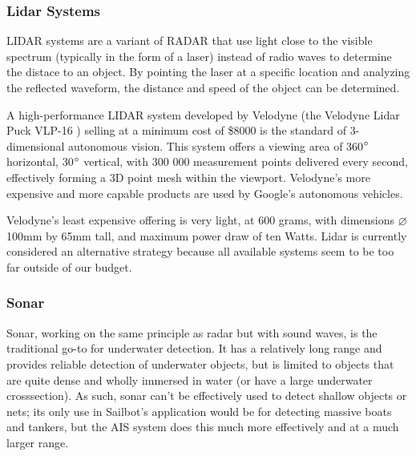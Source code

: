 \subsubsection{\label{sec:intro:alternatives:lidar}Lidar Systems}
LIDAR systems are a variant of RADAR that use light close to the visible spectrum (typically in the form of a laser) instead of radio waves to determine the distace to an object. By pointing the laser at a specific location and analyzing the reflected waveform, the distance and speed of the object can be determined. 

A high-performance LIDAR system developed by Velodyne (the Velodyne Lidar Puck VLP-16 \cite{velodyne-vlp16}) selling at a minimum cost of \$8000 is the standard of 3-dimensional autonomous vision. This system offers a viewing area of 360$\degree$ horizontal, 30$\degree$ vertical, with 300 000 measurement points delivered every second, effectively forming a 3D point mesh within the viewport. Velodyne's more expensive and more capable products are used by Google's autonomous vehicles.

Velodyne's least expensive offering is very light, at 600 grams, with dimensions $\varnothing$100mm by 65mm tall, and maximum power draw of ten Watts. Lidar is currently considered an alternative strategy because all available systems seem to be too far outside of our budget.


\subsubsection{\label{sec:intro:alternatives:sonar}Sonar}
Sonar, working on the same principle as radar but with sound waves, is the traditional go-to for underwater detection. It has a relatively long range and provides reliable detection of underwater objects, but is limited to objects that are quite dense and wholly immersed in water (or have a large underwater crosssection). As such, sonar can't be effectively used to detect shallow objects or nets; its only use in Sailbot's application would be for detecting massive boats and tankers, but the AIS system does this much more effectively and at a much larger range.
